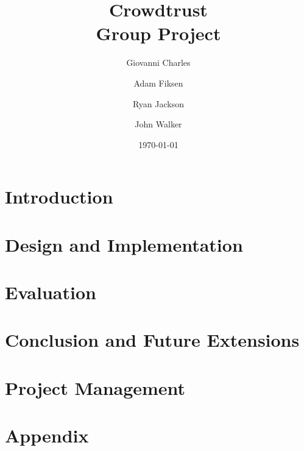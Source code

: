 \documentclass[11pt]{article}
\begin{document}
\title{Crowdtrust\\ Group Project }

\author{Giovanni Charles \and Adam Fiksen \and Ryan Jackson \and John Walker}

\date{\today}         %

\maketitle           %

\section{Introduction}

\section{Design and Implementation}
 
\section{Evaluation}

\section{Conclusion and Future Extensions}

\section{Project Management}

\section{Appendix}


\begin{thebibliography}{9}

\end{thebibliography}
\end{document}
